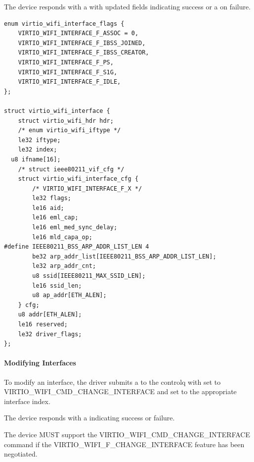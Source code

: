The device responds with a  with updated fields indicating success or a  on failure.

\begin{lstlisting}
enum virtio_wifi_interface_flags {
	VIRTIO_WIFI_INTERFACE_F_ASSOC = 0,
	VIRTIO_WIFI_INTERFACE_F_IBSS_JOINED,
	VIRTIO_WIFI_INTERFACE_F_IBSS_CREATOR,
	VIRTIO_WIFI_INTERFACE_F_PS,
	VIRTIO_WIFI_INTERFACE_F_S1G,
	VIRTIO_WIFI_INTERFACE_F_IDLE,
};

struct virtio_wifi_interface {
	struct virtio_wifi_hdr hdr;
	/* enum virtio_wifi_iftype */
	le32 iftype;
	le32 index;
  u8 ifname[16];
	/* struct ieee80211_vif_cfg */
	struct virtio_wifi_interface_cfg {
		/* VIRTIO_WIFI_INTERFACE_F_X */
		le32 flags;
		le16 aid;
		le16 eml_cap;
		le16 eml_med_sync_delay;
		le16 mld_capa_op;
#define IEEE80211_BSS_ARP_ADDR_LIST_LEN 4
		be32 arp_addr_list[IEEE80211_BSS_ARP_ADDR_LIST_LEN];
		le32 arp_addr_cnt;
		u8 ssid[IEEE80211_MAX_SSID_LEN];
		le16 ssid_len;
		u8 ap_addr[ETH_ALEN];
	} cfg;
	u8 addr[ETH_ALEN];
	le16 reserved;
	le32 driver_flags;
};
\end{lstlisting}


\paragraph{Modifying Interfaces}\label{sec:Device Types / 802.11 Device / Device Operation / Interface Management / Modifying Interfaces}

To modify an interface, the driver submits a  to the controlq with  set to VIRTIO_WIFI_CMD_CHANGE_INTERFACE and  set to the appropriate interface index.

The device responds with a  indicating success or failure.


The device MUST support the VIRTIO_WIFI_CMD_CHANGE_INTERFACE command if the VIRTIO_WIFI_F_CHANGE_INTERFACE feature has been negotiated.

